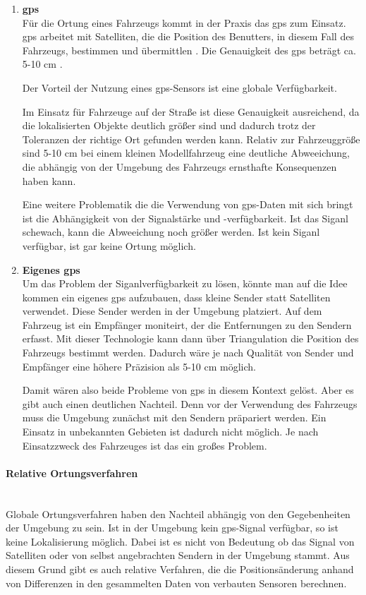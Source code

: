\begin{enumerate}[leftmargin=*]
    \item \textbf{\acf{gps}} \\
    Für die Ortung eines Fahrzeugs kommt in der Praxis das \ac{gps} zum Einsatz. 
    \ac{gps} arbeitet mit Satelliten, die die Position des Benutters, in diesem Fall des Fahrzeugs, bestimmen und übermittlen \cite{ashby2003relativity}. 
    Die Genauigkeit des \ac{gps} beträgt ca. 5-10 cm \cite{ashby2003relativity}.

    Der Vorteil der Nutzung eines \ac{gps}-Sensors ist eine globale Verfügbarkeit.

    Im Einsatz für Fahrzeuge auf der Straße ist diese Genauigkeit ausreichend, 
    da die lokalisierten Objekte deutlich größer sind und dadurch trotz der Toleranzen der richtige Ort gefunden werden kann.
    Relativ zur Fahrzeuggröße sind 5-10 cm bei einem kleinen Modellfahrzeug eine deutliche Abweeichung, die abhängig von der Umgebung des Fahrzeugs ernsthafte Konsequenzen haben kann.

    Eine weitere Problematik die die Verwendung von \ac{gps}-Daten mit sich bringt ist die Abhängigkeit von der Signalstärke und -verfügbarkeit. 
    Ist das Siganl schewach, kann die Abweeichung noch größer werden. 
    Ist kein Siganl verfügbar, ist gar keine Ortung möglich.
    
    \item \textbf{Eigenes \ac{gps}} \\
    Um das Problem der Siganlverfügbarkeit zu lösen, könnte man auf die Idee kommen ein eigenes \acf{gps} aufzubauen, dass kleine Sender statt Satelliten verwendet.
    Diese Sender werden in der Umgebung platziert. 
    Auf dem Fahrzeug ist ein Empfänger moniteirt, der die Entfernungen zu den Sendern erfasst.
    Mit dieser Technologie kann dann über Triangulation die Position des Fahrzeugs bestimmt werden. 
    Dadurch wäre je nach Qualität von Sender und Empfänger eine höhere Präzision als 5-10 cm möglich. 
    
    Damit wären also beide Probleme von \ac{gps} in diesem Kontext gelöst. 
    Aber es gibt auch einen deutlichen Nachteil. 
    Denn vor der Verwendung des Fahrzeugs muss die Umgebung zunächst mit den Sendern präpariert werden. 
    Ein Einsatz in unbekannten Gebieten ist dadurch nicht möglich. 
    Je nach Einsatzzweck des Fahrzeuges ist das ein großes Problem.
\end{enumerate}

\paragraph{Relative Ortungsverfahren} \mbox{}\\
Globale Ortungsverfahren haben den Nachteil abhängig von den Gegebenheiten der Umgebung zu sein.
Ist in der Umgebung kein \ac{gps}-Signal verfügbar, so ist keine Lokalisierung möglich.
Dabei ist es nicht von Bedeutung ob das Signal von Satelliten oder von selbst angebrachten Sendern in der Umgebung stammt.
Aus diesem Grund gibt es auch relative Verfahren, die die Positionsänderung anhand von Differenzen in den gesammelten Daten von verbauten Sensoren berechnen.

